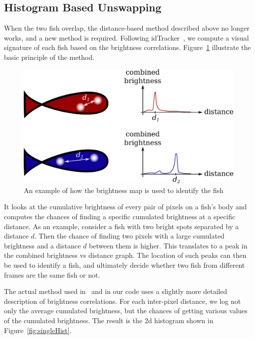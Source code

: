 \documentclass{article}
\begin{document}


\subsection{Histogram Based Unswapping}
\label{sec:Histogram Based Unswapping}

When the two fish overlap, the distance-based method described above no longer works, and a new method is required. Following idTracker~\cite{perez-escudero_idtracker_2014}, we compute a visual signature of each fish based on the brightness correlations. Figure~\ref{fig:brightness-correlation} illustrate the basic principle of the method. 

\begin{figure}[H]
	\centering
	\includegraphics[width=0.6\linewidth]{brightness-correlation}
	\caption{An example of how the brightness map is used to identify the fish}
	\label{fig:brightness-correlation}
\end{figure}

It looks at the cumulative brightness of every pair of pixels on a fish's body and computes the chances of finding a specific cumulated brightness at a specific distance. As an example, consider a fish with two bright spots separated by a distance $d$. Then the chance of finding two pixels with a large cumulated brightness and a distance $d$ between them is higher. This translates to a peak in the combined brightness vs distance graph. The location of such peaks can then be used to identify a fish, and ultimately decide whether two fish from different frames are the same fish or not. 

The actual method used in~\cite{perez-escudero_idtracker_2014} and in our code uses a slightly more detailed description of brightness correlations. For each inter-pixel distance, we log not only the average cumulated brightness, but the chances of getting various values of the cumulated brightness. The result is the 2d histogram shown in Figure~\ref{fig:singleHist}.
\end{document}
